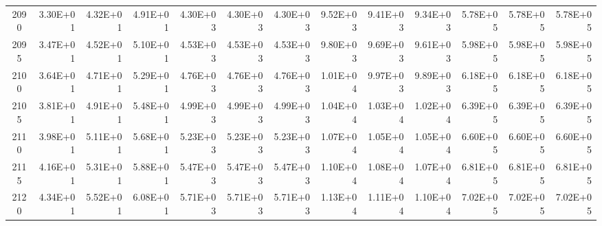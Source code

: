 \documentclass{article}
\begin{document}
\begin{table}
\begin{tabular}{crrr|rrr|rrr|rrr}
2090     & 3.30E+01 & 4.32E+01 & 4.91E+01 & 4.30E+03 & 4.30E+03 & 4.30E+03 & 9.52E+03 & 9.41E+03 & 9.34E+03 & 5.78E+05 & 5.78E+05 & 5.78E+05 \\
2095     & 3.47E+01 & 4.52E+01 & 5.10E+01 & 4.53E+03 & 4.53E+03 & 4.53E+03 & 9.80E+03 & 9.69E+03 & 9.61E+03 & 5.98E+05 & 5.98E+05 & 5.98E+05 \\
2100     & 3.64E+01 & 4.71E+01 & 5.29E+01 & 4.76E+03 & 4.76E+03 & 4.76E+03 & 1.01E+04 & 9.97E+03 & 9.89E+03 & 6.18E+05 & 6.18E+05 & 6.18E+05 \\
2105     & 3.81E+01 & 4.91E+01 & 5.48E+01 & 4.99E+03 & 4.99E+03 & 4.99E+03 & 1.04E+04 & 1.03E+04 & 1.02E+04 & 6.39E+05 & 6.39E+05 & 6.39E+05 \\
2110     & 3.98E+01 & 5.11E+01 & 5.68E+01 & 5.23E+03 & 5.23E+03 & 5.23E+03 & 1.07E+04 & 1.05E+04 & 1.05E+04 & 6.60E+05 & 6.60E+05 & 6.60E+05 \\
2115     & 4.16E+01 & 5.31E+01 & 5.88E+01 & 5.47E+03 & 5.47E+03 & 5.47E+03 & 1.10E+04 & 1.08E+04 & 1.07E+04 & 6.81E+05 & 6.81E+05 & 6.81E+05 \\
2120     & 4.34E+01 & 5.52E+01 & 6.08E+01 & 5.71E+03 & 5.71E+03 & 5.71E+03 & 1.13E+04 & 1.11E+04 & 1.10E+04 & 7.02E+05 & 7.02E+05 & 7.02E+05
\end{tabular} 
\end{table}
\end{document}
